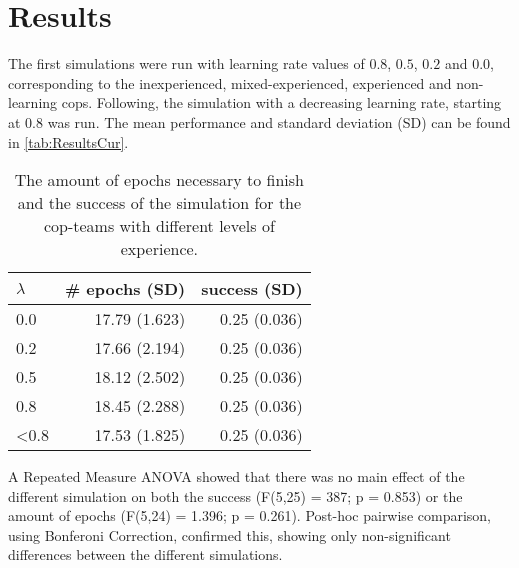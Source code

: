 \section{Results}

The first simulations were run with learning rate values of $0.8$, $0.5$, $0.2$ and $0.0$, corresponding to the inexperienced, mixed-experienced, experienced and non-learning cops. Following, the simulation with a decreasing learning rate, starting at $0.8$ was run. The mean performance and standard deviation (SD) can be found in \autoref{tab:ResultsCur}. 
\begin{table}
\begin{center}
\begin{tabular}{l r  r}
$\lambda$ &  \# epochs (SD) & success (SD)\\
\hline
0.0 & 17.79 (1.623) & 0.25 (0.036) \\
0.2 & 17.66 (2.194) & 0.25 (0.036) \\
0.5 & 18.12 (2.502) & 0.25 (0.036) \\
0.8 & 18.45 (2.288) & 0.25 (0.036) \\
<0.8 & 17.53 (1.825) & 0.25 (0.036) \\
\hline
\end{tabular}
\caption{The amount of epochs necessary to finish and the success of the simulation for the cop-teams with different levels of experience. }
\label{tab:ResultsCur}
\end{center}
\end{table}

A Repeated Measure ANOVA showed that there was no main effect of the different simulation on both the success (F(5,25) = 387; p = 0.853) or the amount of epochs (F(5,24) = 1.396; p = 0.261). Post-hoc pairwise comparison, using Bonferoni Correction, confirmed this, showing only non-significant differences between the different simulations.


